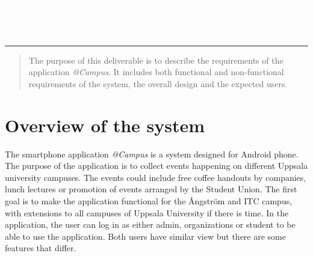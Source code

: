 \documentclass[12pt, oneside]{article}   	%
\author{%
    Elsa Bergman \\     Angelica Elvin  \\  Anna Eriksson   \\ Arvid Gr\"{a}ns \\ Frida Korns\"{a}ter \\ Frans Larsson  \\       Therese Olsson
    }
\makeatletter
\def\printauthor{%
    {\large \@author}}
\makeatother
\begin{document}
 
\begin{titlepage}
\BgThispage
{}
\vspace*{2cm}
\noindent
\textcolor{white}{\Huge{\textbf{Deliverable II}}} \\
\\
\textcolor{white}{\Large Requirements of the smartphone application \textit{@Campus}}
\vspace*{2.5cm}\par
\noindent
\begin{minipage}{0.35\linewidth}
    \begin{flushright}
        \printauthor
    \end{flushright}
\end{minipage} \hspace{15pt}
%
\begin{minipage}{0.02\linewidth}
    \rule{1pt}{175pt}
\end{minipage} \hspace{-10pt}
%
\begin{minipage}{0.6\linewidth}
\vspace{5pt}
	\renewcommand{\abstractname}{Introduction}
    \begin{abstract} 
\noindent The purpose of this deliverable is to describe the requirements of the application \textit{@Campus}. It includes both functional and non-functional requirements of the system, the overall design and the expected users. 
    \end{abstract}
\end{minipage}
\end{titlepage}
\restoregeometry

\pagestyle{myheader}





\newpage
\section{Overview of the system}
The smartphone application \textit{@Campus} is a system designed for Android phone. The purpose of the application is to collect events happening on different Uppsala university campuses. The events could include free coffee handouts by companies, lunch lectures or promotion of events arranged by the Student Union. The first goal is to make the application functional for the \AA ngstr\"{o}m and ITC campus, with extensions to all campuses of Uppsala University if there is time. In the application, the user can log in as either admin, organizations or student to be able to use the application. Both users have similar view but there are some features that differ. 
\end{document}
